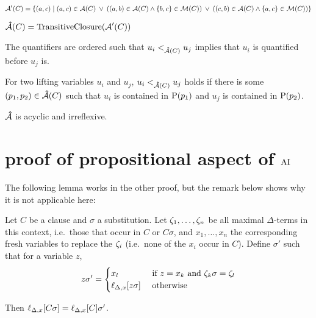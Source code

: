 \documentclass[,%
	paper=a4,%
	DIV14, %
	twoside=false,%
	liststotoc,
	bibtotoc,
	draft=false,%
	numbers=noendperiod
]{scrartcl}
\begin{document}

$\operatorname{\mathcal{A}}'(C) = \{ (a,c) \mid  (a,c) \in  \operatorname{\mathcal{A}}(C) \;\,{\lor}\;\, ((a,b) \in \operatorname{\mathcal{A}}(C) \land \{b, c\} \in \operatorname{\operatorname{\mathcal{M}}}(C) ) \;\,{\lor}\;\,  ((c, b) \in \operatorname{\mathcal{A}}(C) \land \{a, c\} \in \operatorname{\operatorname{\mathcal{M}}}(C)) \}$
	

$\operatorname{{\mathcal{\bm{\hat}A}}}(C) = \operatorname{TransitiveClosure}(\operatorname{\mathcal{A}}'(C))$

The quantifiers are ordered such that $u_i <_{\operatorname{{\mathcal{\bm{\hat}A}}}(C)} u_j$ implies that $u_i$ is quantified before $u_j$ is.


\begin{defi}
	For two lifting variables $u_i$ and $u_j$, $u_i <_{\operatorname{{\mathcal{\bm{\hat}A}}}(C)} u_j$ holds if there is some $(p_1, p_2) \in \operatorname{{\mathcal{\bm{\hat}A}}}(C)$ such that $u_i$ is contained in $\operatorname{{\operatorname P}}(p_1)$ and  $u_j$ is contained in $\operatorname{{\operatorname P}}(p_2)$.
\end{defi}

\begin{conj}
	$\operatorname{{\mathcal{\bm{\hat}A}}}$ is acyclic and irreflexive.
\end{conj}


\clearpage

\section{proof of propositional aspect of $\operatorname{AI}$}

The following lemma works in the other proof, but the remark below shows why it is not applicable here:

\begin{lemma} 
	\label{lemma:lift_subst_commute}
	Let $C$ be a clause and $\sigma$ a substitution.
	Let $\zeta_{1},\ldots,\zeta_{n}$ be all maximal $\Delta$-terms in this context, i.e.\ those that occur in $C$ or $C\sigma$,  and
	$x_1, \ldots, x_n$ the corresponding fresh variables to replace the $\zeta_{i}$ (i.e.~none of the $x_i$ occur in $C$).
	Define $\sigma'$ such that for a variable $z$,
	\[
		z \sigma' =
		\begin{cases} 
			x_l & \text{ if } z = x_k \text{ and } \zeta_{k}\sigma = \zeta_{l}  \\
			\ell_{\Delta,x}[z\sigma] & \text{ otherwise}
		\end{cases} 
	\]

	Then
	$\ell_{\Delta,x}[C\sigma] =
	\ell_{\Delta,x}[C]\sigma'$.
\end{lemma}
\end{document}
